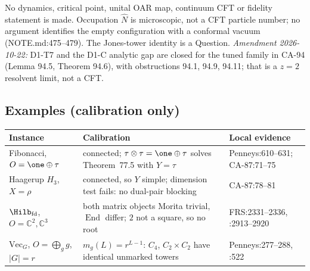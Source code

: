 No dynamics, critical point, unital OAR map, continuum CFT or fidelity
statement is made.  Occupation \(\hat N\) is microscopic, not a CFT particle
number; no argument identifies the empty configuration with a conformal vacuum
(NOTE.md:475--479).  The Jones-tower identity is a Question.  \emph{Amendment 2026-10-22:} D1-T7 and the D1-C analytic gap
are closed for the tuned family in CA-94 (Lemma 94.5, Theorem 94.6), with obstructions 94.1, 94.9, 94.11; that is a \(z{=}2\) resolvent limit, not a CFT.

\subsection{Examples (calibration only)}

\begin{center}\footnotesize
\begin{tabular}{p{3.2cm}p{7.4cm}p{3.6cm}}
\toprule
Instance & Calibration & Local evidence \\
\midrule
Fibonacci, \(O=\one\oplus\tau\) & connected; \(\tau\otimes\tau=\one\oplus\tau\) solves Theorem~77.5 with \(Y=\tau\) & Penneys:610--631; CA-87:71--75 \\
Haagerup \(H_3\), \(X=\rho\) & connected, so \(Y\) simple; dimension test fails: no dual-pair blocking & CA-87:78--81 \\
\(\Hilb_{\mathrm{fd}}\), \(O=\mathbb C^2,\mathbb C^3\) & both matrix objects Morita trivial, \(\operatorname{End}\) differ; \(2\) not a square, so no root & FRS:2331--2336, :2913--2920 \\
\(\mathrm{Vec}_G\), \(O=\bigoplus_gg\), \(|G|=r\) & \(m_g(L)=r^{L-1}\): \(C_4\), \(C_2\times C_2\) have identical unmarked towers & Penneys:277--288, :522 \\
\bottomrule
\end{tabular}
\end{center}
